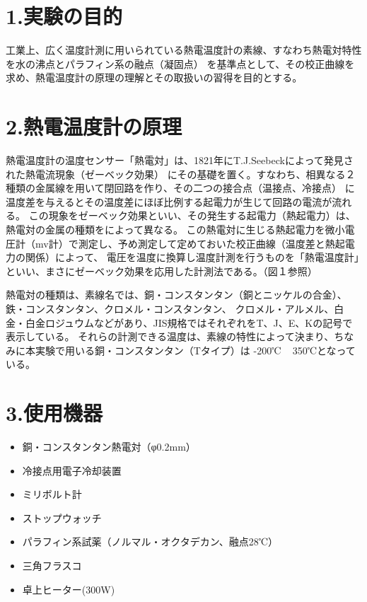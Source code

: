 

\section{1.実験の目的}
工業上、広く温度計測に用いられている熱電温度計の素線、すなわち熱電対特性を水の沸点とパラフィン系の融点（凝固点）
を基準点として、その校正曲線を求め、熱電温度計の原理の理解とその取扱いの習得を目的とする。

\section{2.熱電温度計の原理}
熱電温度計の温度センサー「熱電対」は、1821年にT.J.Seebeckによって発見された熱電流現象（ゼーベック効果）
にその基礎を置く。すなわち、相異なる２種類の金属線を用いて閉回路を作り、その二つの接合点（温接点、冷接点）
に温度差を与えるとその温度差にほぼ比例する起電力が生じて回路の電流が流れる。
この現象をゼーベック効果といい、その発生する起電力（熱起電力）は、熱電対の金属の種類をによって異なる。
この熱電対に生じる熱起電力を微小電圧計（mv計）で測定し、予め測定して定めておいた校正曲線（温度差と熱起電力の関係）によって、
電圧を温度に換算し温度計測を行うものを「熱電温度計」といい、まさにゼーベック効果を応用した計測法である。（図１参照）

熱電対の種類は、素線名では、銅・コンスタンタン（銅とニッケルの合金）、鉄・コンスタンタン、クロメル・コンスタンタン、
クロメル・アルメル、白金・白金ロジュウムなどがあり、JIS規格ではそれぞれをT、J、E、Kの記号で表示している。
それらの計測できる温度は、素線の特性によって決まり、ちなみに本実験で用いる銅・コンスタンタン（Tタイプ）は
-200℃ ~ 350℃となっている。

\section{3.使用機器}
\begin{itemize}
  \item 銅・コンスタンタン熱電対（φ0.2mm）
  \item 冷接点用電子冷却装置
  \item ミリボルト計
  \item ストップウォッチ
  \item パラフィン系試薬（ノルマル・オクタデカン、融点28℃）
  \item 三角フラスコ
  \item 卓上ヒーター(300W)
\end{itemize}



